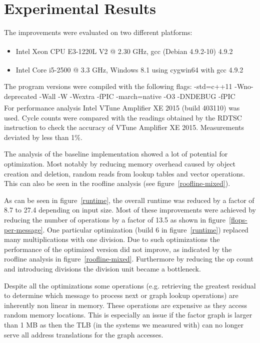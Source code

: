 \section{Experimental Results}\label{sec:results}

 The improvements were evaluated on two different platforms:
\begin{itemize}
\item Intel\textsuperscript{\textregistered} Xeon CPU E3-1220L V2 @ 2.30 GHz, gcc (Debian 4.9.2-10) 4.9.2
\item Intel\textsuperscript{\textregistered} Core i5-2500 @ 3.3 GHz, Windows 8.1 using cygwin64 with gcc 4.9.2
\end{itemize}

The program versions were compiled with the following flags: 
-std=c++11 -Wno-deprecated -Wall -W -Wextra -fPIC -march=native -O3 -DNDEBUG -fPIC
\\
For performance analysis Intel\textsuperscript{\textregistered} VTune Amplifier XE 2015 (build 403110) was used. Cycle counts were compared with the readings obtained by the RDTSC instruction to check the accuracy of VTune Amplifier XE 2015. Measurements deviated by less than 1\%.

The analysis of the baseline implementation showed a lot of potential for optimization. Most notably by reducing memory overhead caused by object creation and deletion, random reads from lookup tables and vector operations. This can also be seen in the roofline analysis \cite{Ofenbeck:14} (see figure~\ref{roofline-mixed}).

As can be seen in figure~\ref{runtime}, the overall runtime was reduced by a factor of 8.7 to 27.4 depending on input size. Most of these improvements were achieved by reducing the number of operations by a factor of 13.5 as shown in figure~\ref{flops-per-message}. One particular optimization (build 6 in figure~\ref{runtime}) replaced many multiplications with one division. Due to such optimizations the performance of the optimized version did not improve, as indicated by the roofline analysis in figure~\ref{roofline-mixed}. Furthermore by reducing the op count and introducing divisions the division unit became a bottleneck.

Despite all the optimizations some operations (e.g. retrieving the greatest residual to determine which message to process next or graph lookup operations) are inherently non linear in memory. These operations are expensive as they access random memory locations. This is especially an issue if the factor graph is larger than 1 MB as then the TLB (in the systems we measured with) can no longer serve all address translations for the graph accesses.

